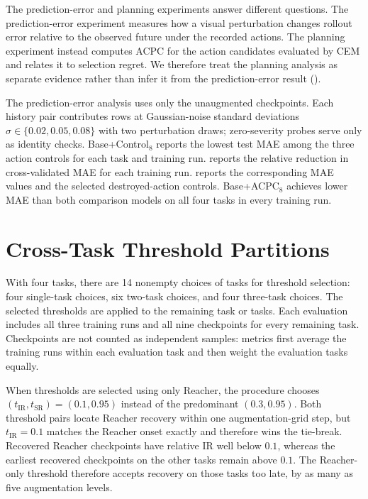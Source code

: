 \documentclass{article}
\begin{document}
The prediction-error and planning experiments answer different questions. The
prediction-error experiment measures how a visual perturbation changes
rollout error relative to the observed future under the recorded actions. The
planning experiment instead computes ACPC for the action candidates evaluated
by CEM and relates it to selection regret. We therefore treat the planning
analysis as separate evidence rather than infer it from the prediction-error
result ().

The prediction-error analysis uses only the unaugmented checkpoints.
Each history pair contributes rows at Gaussian-noise standard deviations
$\sigma\in\{0.02,0.05,0.08\}$ with two perturbation draws; zero-severity probes
serve only as identity checks.
Base+Control$_8$ reports the lowest test MAE
among the three action controls for each task and training run.
 reports the relative reduction in
cross-validated MAE for each training run.
 reports the corresponding MAE values
and the selected destroyed-action controls. Base+ACPC$_8$ achieves lower MAE
than both comparison models on all four tasks in every training run.




\FloatBarrier
\section{Cross-Task Threshold Partitions}\label{sec:appendix-cross-task}

With four tasks, there are 14 nonempty choices of tasks for threshold
selection: four single-task choices, six two-task choices, and four three-task
choices. The selected thresholds are applied to the remaining task or tasks.
Each evaluation includes all three training runs and all nine checkpoints for
every remaining task. Checkpoints are not counted as independent samples:
metrics first average the training runs within each evaluation task and then
weight the evaluation tasks equally.

When thresholds are selected using only Reacher, the procedure chooses
$(t_{\mathrm{IR}},t_{\mathrm{SR}})=(0.1,0.95)$ instead of the predominant
$(0.3,0.95)$. Both threshold pairs locate Reacher recovery within one
augmentation-grid step, but $t_{\mathrm{IR}}=0.1$ matches the Reacher onset
exactly and therefore wins the tie-break. Recovered Reacher checkpoints have
relative IR well below $0.1$, whereas the earliest recovered checkpoints on
the other tasks remain above $0.1$. The Reacher-only threshold therefore
accepts recovery on those tasks too late, by as many as five augmentation
levels.
\end{document}
